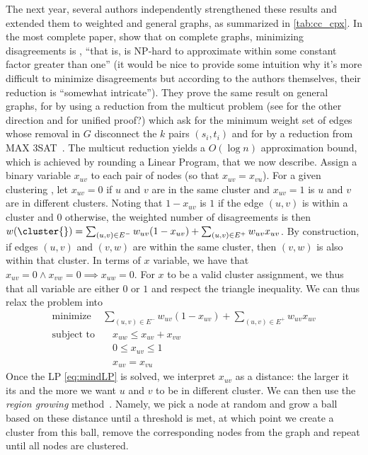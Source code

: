 The next year, several authors independently strengthened these results and extended them to
weighted and general graphs, as summarized in \autoref{tab:cc_cpx}. In the most complete paper,
\textcite{Charikar2003} show that on complete graphs, minimizing disagreements is \APXh{},
\enquote{that is, is NP-hard to approximate within some constant factor greater than one} (it would
be nice to provide some intuition why it's more difficult to minimize disagreements but according to
the authors themselves, their reduction is \enquote{somewhat intricate}). They prove the same result
on general graphs, for \mind{} by using a reduction from the multicut problem \autocite[Theorem
8]{Charikar2003} (see \autocite{Emanuel2003} for the other direction and \autocite{Demaine2006} for
unified proof?) which ask for the minimum weight set of edges whose removal in $G$ disconnect the
$k$ pairs $(s_i, t_i)$ and for \maxa{} by a reduction from MAX 3SAT~\autocite[Theorem
9]{Charikar2003}. The multicut reduction yields a $O(\log n)$ approximation bound, which is achieved
by rounding a Linear Program, that we now describe. Assign a binary variable $x_{uv}$ to each pair
of nodes (so that $x_{uv}=x_{vu}$). For a given clustering \cluster{}, let $x_{uv} = 0$ if $u$ and
$v$ are in the same cluster and $x_{uv}=1$ is $u$ and $v$ are in different clusters. Noting that
$1-x_{uv}$ is $1$ if the edge $(u,v)$ is within a cluster and $0$ otherwise, the weighted
number of disagreements is then $w(\cluster{}) = \sum_{(u,v)\in E^-} w_{uv}(1-x_{uv}) +
\sum_{(u,v)\in E^+} w_{uv}x_{uv}$. By construction, if edges $(u,v)$ and $(v,w)$ are within the same
cluster, then $(v, w)$ is also within that cluster. In terms of $x$ variable, we have that $x_{uv}=0
\wedge x_{vw}=0 \implies x_{uw} = 0$. For $x$ to be a valid cluster assignment, we thus that all
variable are either $0$ or $1$ and respect the triangle inequality. We can thus relax the problem into
\begin{align}
   \label{eq:mindLP}
   \text{minimize } & \sum_{(u,v)\in E^-} w_{uv}(1-x_{uv}) + \sum_{(u,v)\in E^+} w_{uv}x_{uv} \\
   \text{subject to}& \quad x_{uw} \leq x_{uv} + x_{vw} \nonumber\\
   \phantom{subject to}& \quad 0 \leq x_{uv} \leq 1  \nonumber \\
   \phantom{subject to}& \quad x_{uv} = x_{vu}  \nonumber
\end{align}
Once the LP \eqref{eq:mindLP} is solved, we interpret $x_{uv}$ as a distance: the larger it its and
the more we want $u$ and $v$ to be in different cluster. We can then use the \emph{region growing}
method~\autocite{RegionGrowing93}. Namely, we pick a node at random and grow a ball based on these
distance until a threshold is met, at which point we create a cluster from this ball, remove the
corresponding nodes from the graph and repeat until all nodes are clustered.

